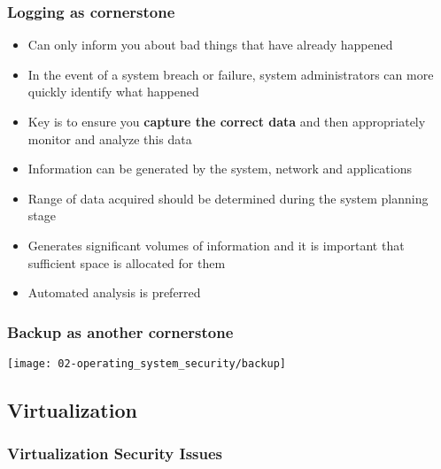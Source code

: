 \subsubsection{Logging as cornerstone}
\begin{itemize}
    \item Can only inform you about bad things that have already happened
    \item In the event of a system breach or failure, system administrators can more quickly identify what happened
    \item Key is to ensure you \textbf{capture the correct data} and then appropriately monitor and analyze this data
    \item Information can be generated by the system, network and applications
    \item Range of data acquired should be determined during the system planning stage
    \item Generates significant volumes of information and it is important that sufficient space is allocated for them
    \item Automated analysis is preferred
\end{itemize}

\subsubsection{Backup as another cornerstone}
\begin{center}
    \vspace{-8pt}
    \texttt{[image: 02-operating\_system\_security/backup]}
    \vspace{-8pt}
\end{center}

\subsection{Virtualization}

\subsubsection{Virtualization Security Issues}

